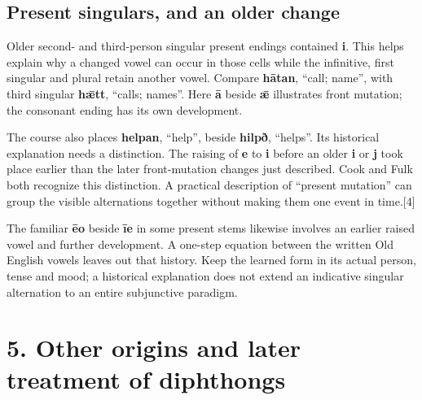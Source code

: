 \subsection*{Present singulars, and an older change}
Older second- and third-person singular present endings contained \textbf{i}. This helps explain why a changed vowel can occur in those cells while the infinitive, first singular and plural retain another vowel. Compare \textbf{hātan}, “call; name”, with third singular \textbf{hǣtt}, “calls; names”. Here \textbf{ā} beside \textbf{ǣ} illustrates front mutation; the consonant ending has its own development.\par
The course also places \textbf{helpan}, “help”, beside \textbf{hilpð}, “helps”. Its historical explanation needs a distinction. The raising of \textbf{e} to \textbf{i} before an older \textbf{i} or \textbf{j} took place earlier than the later front-mutation changes just described. Cook and Fulk both recognize this distinction. A practical description of “present mutation” can group the visible alternations together without making them one event in time.[4]\par
The familiar \textbf{ēo} beside \textbf{īe} in some present stems likewise involves an earlier raised vowel and further development. A one-step equation between the written Old English vowels leaves out that history. Keep the learned form in its actual person, tense and mood; a historical explanation does not extend an indicative singular alternation to an entire subjunctive paradigm.\par
\section*{5. Other origins and later treatment of diphthongs}
